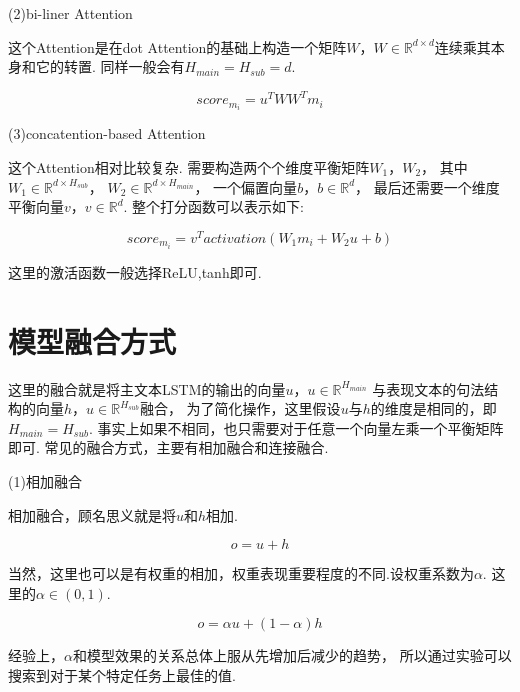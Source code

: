 \documentclass[bachelor,adobefonts]{jnuthesis}
\begin{document}
(2)bi-liner Attention

这个Attention是在dot Attention的基础上构造一个矩阵$W$，$W \in \mathbb{R}^{d \times d}$连续乘其本身和它的转置.
同样一般会有$H_{main} = H_{sub} = d $.

\begin{equation}
  score_{m_{i}} = u^{T}WW^{T}m_{i}
\end{equation}


(3)concatention-based Attention

这个Attention相对比较复杂.
需要构造两个个维度平衡矩阵$W_{1}$，$W_{2}$，
其中$W_{1} \in \mathbb{R}^{d \times H_{sub}}$，
$W_{2} \in \mathbb{R}^{d \times H_{main}}$，
一个偏置向量$b$，$b \in \mathbb{R}^{d}$，
最后还需要一个维度平衡向量$v$，$v \in \mathbb{R}^{d}$.
整个打分函数可以表示如下:

\begin{equation}
  score_{m_{i}} = v^{T}activation(W_{1}m_{i}+W_{2}u+b)
\end{equation}

这里的激活函数一般选择ReLU,tanh即可.



\section{模型融合方式}
这里的融合就是将主文本LSTM的输出的向量$u$，$u \in \mathbb{R}^{H_{main}}$
与表现文本的句法结构的向量$h$，$u \in \mathbb{R}^{H_{sub}}$融合，
为了简化操作，这里假设$u$与$h$的维度是相同的，即$H_{main} = H_{sub}$.
事实上如果不相同，也只需要对于任意一个向量左乘一个平衡矩阵即可.
常见的融合方式，主要有相加融合和连接融合.

(1)相加融合

相加融合，顾名思义就是将$u$和$h$相加.

\begin{equation}
  o = u + h
\end{equation}

当然，这里也可以是有权重的相加，权重表现重要程度的不同.设权重系数为$\alpha$.
这里的$\alpha \in (0,1)$.

\begin{equation}
  o = \alpha u + (1-\alpha)h
\end{equation}

经验上，$\alpha$和模型效果的关系总体上服从先增加后减少的趋势，
所以通过实验可以搜索到对于某个特定任务上最佳的值.
\end{document}
